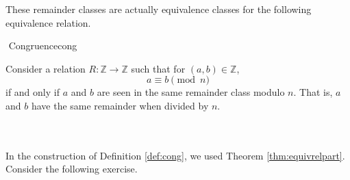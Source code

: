     These remainder classes are actually equivalence classes for the following equivalence relation.
    \begin{definition}{\Stop\,\,Congruence}{cong}
    
        Consider a relation \(R:\mathbb{Z}\to\mathbb{Z}\) such that for \((a,b)\in\mathbb{Z}\),
        \begin{equation*}
            a\equiv b \pmod n
        \end{equation*}
        if and only if \(a\) and \(b\) are seen in the same remainder class modulo \(n\). That is, \(a\) and \(b\) have the same remainder when divided by \(n\).
    
    \end{definition}
    \pagebreak
    \vphantom
    \\
    \\
    In the construction of Definition \ref{def:cong}, we used Theorem \ref{thm:equivrelpart}. Consider the following exercise.
